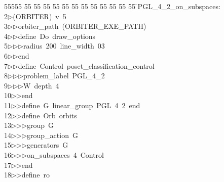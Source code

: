 %
%
\begin{tabbing}
55555 \= 55 \= 55 \= 55 \= 55 \= 55 \= 55 \= 55 \= 55 \= 55 \= 55 \= 55 \= 55 \= \>PGL\_4\_2\_on\_subspaces:\\[0pt]
2\>$\triangleright$\>(ORBITER)\ v\ 5\ \\[0pt]
3\>$\triangleright$\>$\triangleright$\>orbiter\_path\ (ORBITER\_EXE\_PATH)\ \\[0pt]
4\>$\triangleright$\>$\triangleright$\>define\ Do\ draw\_options\ \\[0pt]
5\>$\triangleright$\>$\triangleright$\>$\triangleright$\>radius\ 200\ line\_width\ 03\ \\[0pt]
6\>$\triangleright$\>$\triangleright$\>end\ \\[0pt]
7\>$\triangleright$\>$\triangleright$\>define\ Control\ poset\_classification\_control\ \\[0pt]
8\>$\triangleright$\>$\triangleright$\>$\triangleright$\>problem\_label\ PGL\_4\_2\ \\[0pt]
9\>$\triangleright$\>$\triangleright$\>$\triangleright$\>W\ depth\ 4\ \\[0pt]
10\>$\triangleright$\>$\triangleright$\>end\ \\[0pt]
11\>$\triangleright$\>$\triangleright$\>define\ G\ linear\_group\ PGL\ 4\ 2\ end\ \\[0pt]
12\>$\triangleright$\>$\triangleright$\>define\ Orb\ orbits\ \\[0pt]
13\>$\triangleright$\>$\triangleright$\>$\triangleright$\>group\ G\ \\[0pt]
14\>$\triangleright$\>$\triangleright$\>$\triangleright$\>group\_action\ G\ \\[0pt]
15\>$\triangleright$\>$\triangleright$\>$\triangleright$\>generators\ G\ \\[0pt]
16\>$\triangleright$\>$\triangleright$\>$\triangleright$\>on\_subspaces\ 4\ Control\ \\[0pt]
17\>$\triangleright$\>$\triangleright$\>end\ \\[0pt]
18\>$\triangleright$\>$\triangleright$\>define\ ro\ \\[0pt]

\end{tabbing}

